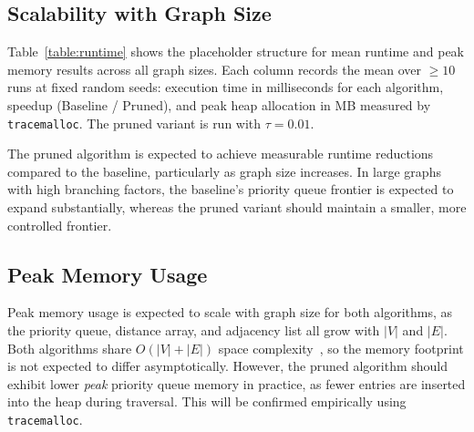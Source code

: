 \subsection{Scalability with Graph Size}

Table~\ref{table:runtime} shows the placeholder structure for mean runtime and peak memory results across all graph sizes. Each column records the mean over $\geq10$ runs at fixed random seeds: execution time in milliseconds for each algorithm, speedup (Baseline / Pruned), and peak heap allocation in MB measured by \texttt{tracemalloc}. The pruned variant is run with $\tau=0.01$.

\begin{table}[h!]
\centering
{}
\caption[Runtime and memory comparison]{Expected mean execution time and peak memory for both algorithms across input sizes ($\tau=0.01$, $\geq10$ runs). Speedup = Baseline\,/\,Pruned time. To be populated after experiments.}
\label{table:runtime}
\end{table}

The pruned algorithm is expected to achieve measurable runtime reductions compared to the baseline, particularly as graph size increases. In large graphs with high branching factors, the baseline's priority queue frontier is expected to expand substantially, whereas the pruned variant should maintain a smaller, more controlled frontier.

\subsection{Peak Memory Usage}

Peak memory usage is expected to scale with graph size for both algorithms, as the priority queue, distance array, and adjacency list all grow with $|V|$ and $|E|$. Both algorithms share $O(|V|+|E|)$ space complexity~\citep{cormen2009}, so the memory footprint is not expected to differ asymptotically. However, the pruned algorithm should exhibit lower \emph{peak} priority queue memory in practice, as fewer entries are inserted into the heap during traversal. This will be confirmed empirically using \texttt{tracemalloc}.


